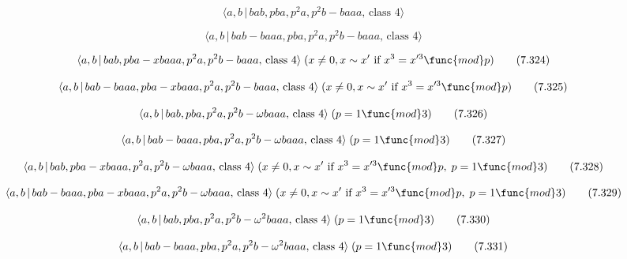 \documentclass[10pt]{article}
\begin{document}
\begin{equation}
\langle a,b\,|\,bab,pba,p^2a,p^2b-baaa,\,\text{class }4\rangle  \tag{7.322}
\end{equation}

\begin{equation}
\langle a,b\,|\,bab-baaa,pba,p^2a,p^2b-baaa,\,\text{class }4\rangle 
\tag{7.323}
\end{equation}

\begin{equation}
\langle a,b\,|\,bab,pba-xbaaa,p^2a,p^2b-baaa,\,\text{class }4\rangle \;(x
\neq 0, x \sim x^{\prime }\text{ if }x^3=x^{\prime 3 }\func{mod} p) 
\tag{7.324}
\end{equation}

\begin{equation}
\langle a,b\,|\,bab-baaa,pba-xbaaa,p^2a,p^2b-baaa,\,\text{class }4\rangle
\;(x \neq 0, x \sim x^{\prime }\text{ if }x^3=x^{\prime 3 }\func{mod} p) 
\tag{7.325}
\end{equation}

\begin{equation}
\langle a,b\,|\,bab,pba,p^{2}a,p^{2}b-\omega baaa,\,\text{class }4\rangle
\;(p=1\func{mod}3)  \tag{7.326}
\end{equation}

\begin{equation}
\langle a,b\,|\,bab-baaa,pba,p^{2}a,p^{2}b-\omega baaa,\,\text{class }%
4\rangle \;(p=1\func{mod}3)  \tag{7.327}
\end{equation}

\begin{equation}
\langle a,b\,|\,bab,pba-xbaaa,p^{2}a,p^{2}b-\omega baaa,\,\text{class }%
4\rangle \;(x\neq 0,x \sim x^{\prime }\text{ if }x^3=x^{\prime 3}\func{mod}%
p,\;p=1\func{mod}3)  \tag{7.328}
\end{equation}

\begin{equation}
\langle a,b\,|\,bab-baaa,pba-xbaaa,p^{2}a,p^{2}b-\omega baaa,\,\text{class }%
4\rangle \;(x\neq 0,x \sim x^{\prime }\text{ if }x^3=x^{\prime 3}\func{mod}%
p,\;p=1\func{mod}3)  \tag{7.329}
\end{equation}

\begin{equation}
\langle a,b\,|\,bab,pba,p^{2}a,p^{2}b-\omega ^{2}baaa,\,\text{class }%
4\rangle \;(p=1\func{mod}3)  \tag{7.330}
\end{equation}

\begin{equation}
\langle a,b\,|\,bab-baaa,pba,p^{2}a,p^{2}b-\omega ^{2}baaa,\,\text{class }%
4\rangle \;(p=1\func{mod}3)  \tag{7.331}
\end{equation}
\end{document}
